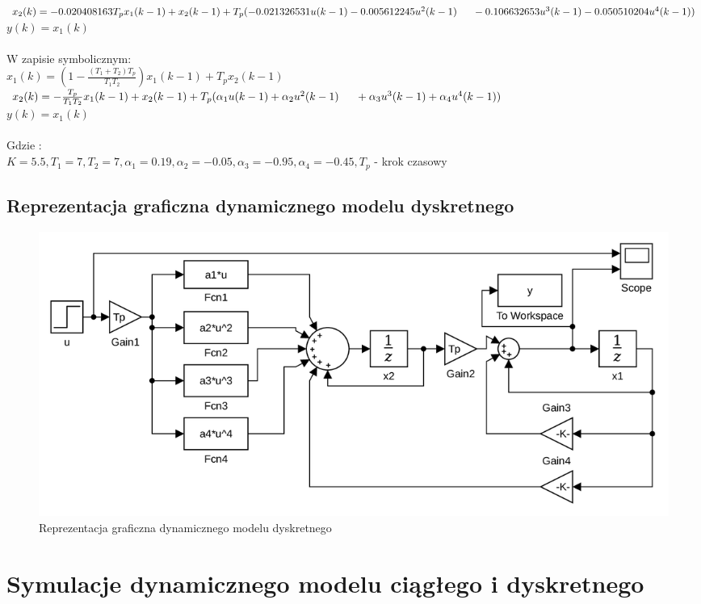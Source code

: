 \documentclass[a4paper, 11pt]{article}
\begin{document}
$x_2(k) = - 0.020408163T_px_1(k-1) + x_2(k-1) + T_p(-0.021326531u(k-1)-0.005612245u^2(k-1)\\
	\indent	- 0.106632653u^3(k-1)-0.050510204u^4(k-1))$
\\

$y(k) = x_1(k)$
\\
\\
W zapisie symbolicznym:
\\

$x_1(k) =(1-\frac{(T_1 + T_2)T_p}{T_1T_2})x_1(k-1)+T_px_2(k-1) $
\\

$x_2(k) = - \frac{T_p}{T_1T_2}x_1(k-1) + x_2(k-1) + T_p(\alpha_1u(k-1)+\alpha_2u^2(k-1)\\
	\indent	+ \alpha_3u^3(k-1)+\alpha_4u^4(k-1))$
\\

$y(k) = x_1(k)$
\\
\\
Gdzie : \\

$K  = 5.5, T_1 = 7, T_2 = 7, \alpha_1 = 0.19, \alpha_2 = -0.05, \alpha_3 = -0.95, \alpha_4 = -0.45, T_p$ - krok czasowy
\\


\subsection{Reprezentacja graficzna dynamicznego modelu dyskretnego}

\begin{figure}[ht]
\centering
\includegraphics[scale=0.28]{dynamiczny_model_dyskretny.png}
\caption{Reprezentacja graficzna dynamicznego modelu dyskretnego}
\end{figure}

\section{Symulacje dynamicznego modelu ciągłego i dyskretnego}
\end{document}
